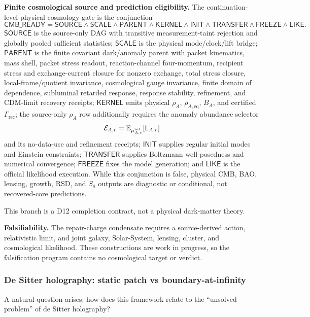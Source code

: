 \textbf{Finite cosmological source and prediction eligibility.}
The continuation-level physical cosmology gate is the conjunction
\[
\mathsf{CMB\_READY}
=
\mathsf{SOURCE}\wedge
\mathsf{SCALE}\wedge
\mathsf{PARENT}\wedge
\mathsf{KERNEL}\wedge
\mathsf{INIT}\wedge
\mathsf{TRANSFER}\wedge
\mathsf{FREEZE}\wedge
\mathsf{LIKE}.
\]
\(\mathsf{SOURCE}\) is the source-only DAG with transitive measurement-taint
rejection and globally pooled sufficient statistics; \(\mathsf{SCALE}\) is the
physical mode/clock/lift bridge; \(\mathsf{PARENT}\) is the finite covariant
dark/anomaly parent with packet kinematics, mass shell, packet stress readout,
reaction-channel four-momentum, recipient stress and exchange-current closure
for nonzero exchange, total stress closure, local-frame/quotient invariance,
cosmological gauge invariance, finite domain of dependence, subluminal
retarded response, response stability, refinement, and CDM-limit recovery
receipts; \(\mathsf{KERNEL}\) emits physical \(\rho_A\),
\(\rho_{A,\mathrm{eq}}\), \(B_A\), and certified \(\Gamma_{\mathrm{rec}}\);
the source-only \(\rho_A\) row additionally requires the anomaly abundance
selector
\[
\mathcal E_{A,r}
=
\mathbb E_{\mu^{\rm rel}_{A,r}}[\mathsf L_{A,r}]
\]
and its no-data-use and refinement receipts;
\(\mathsf{INIT}\) supplies regular initial modes and Einstein constraints;
\(\mathsf{TRANSFER}\) supplies Boltzmann well-posedness and numerical
convergence; \(\mathsf{FREEZE}\) fixes the model generation; and
\(\mathsf{LIKE}\) is the official likelihood execution.  While this conjunction
is false, physical CMB, BAO, lensing, growth, RSD, and \(S_8\) outputs are
diagnostic or conditional, not recovered-core predictions.

This branch is a D12 completion contract, not a physical dark-matter theory.

\textbf{Falsifiability.}  The repair-charge condensate requires a source-derived
action, relativistic limit, and joint galaxy, Solar-System, lensing, cluster,
and cosmological likelihood. These constructions are work in progress, so the
falsification program contains no cosmological target or verdict.

\subsubsection{De Sitter holography: static patch vs boundary-at-infinity}\label{516-de-sitter-holography-static-patch-vs-boundary-at-infinity}

A natural question arises: how does this framework relate to the ``unsolved problem'' of de Sitter holography?

